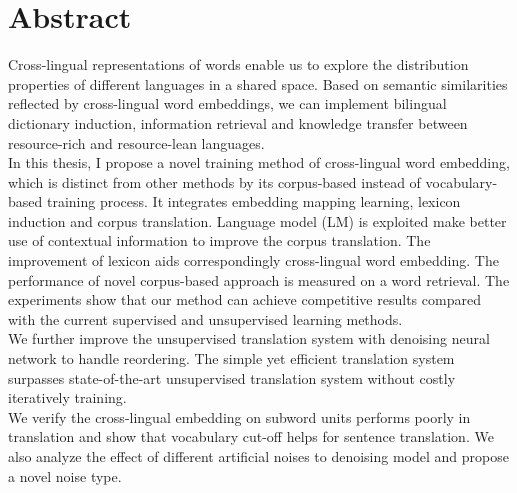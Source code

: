 \chapter{Abstract}
Cross-lingual representations of words enable us to explore the distribution properties of different languages in a shared space. Based on semantic similarities reflected by cross-lingual word embeddings, we can implement bilingual dictionary induction, information retrieval and knowledge transfer between resource-rich and resource-lean languages.\\
In this thesis, I propose a novel training method of cross-lingual word embedding, which is distinct from other methods by  its corpus-based instead of vocabulary-based training process. It integrates embedding mapping learning, lexicon induction and corpus translation. 
Language model (LM) is exploited make better use of contextual information to improve the corpus translation.  The improvement of lexicon aids correspondingly cross-lingual word embedding. The performance of novel corpus-based approach is measured on a word retrieval. The experiments show that our method can achieve competitive results compared with the current supervised and unsupervised learning methods. \\
We further improve the unsupervised translation system with denoising neural network to handle reordering. The simple yet efficient translation system surpasses state-of-the-art unsupervised translation system without costly iteratively training.\\
We verify the cross-lingual embedding on subword units performs poorly in translation and show that vocabulary cut-off helps for sentence translation. We also analyze the effect of different artificial noises to denoising model and propose a novel noise type.



